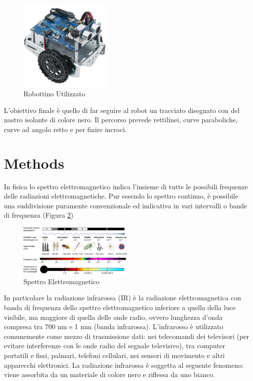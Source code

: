 \documentclass[twoside,twocolumn]{article}
\begin{document}
\begin{figure}[h]
	\centering
	\includegraphics[width=0.4\textwidth]{immagini/robot}
	\caption{Robottino Utilizzato}
	\label{fig:robot}
\end{figure}

L'obiettivo finale è quello di far seguire al robot un tracciato disegnato con del nastro isolante di colore nero. Il percorso prevede rettilinei, curve paraboliche, curve ad angolo retto e per finire incroci.

\section{Methods}

In fisica lo spettro elettromagnetico indica l'insieme di tutte le possibili frequenze delle radiazioni elettromagnetiche. Pur essendo lo spettro continuo, è possibile una suddivisione puramente convenzionale ed indicativa in vari intervalli o bande di frequenza (Figura \ref{fig:spettro})

\begin{figure}[h]
	\centering
	\includegraphics[width=0.5\textwidth]{immagini/spettro}
	\caption{Spettro Elettromagnetico}
	\label{fig:spettro}
\end{figure}

In particolare la radiazione infrarossa (IR) è la radiazione elettromagnetica con banda di frequenza dello spettro elettromagnetico inferiore a quella della luce visibile, ma maggiore di quella delle onde radio, ovvero lunghezza d'onda compresa tra 700 nm e 1 mm (banda infrarossa).
L'infrarosso è utilizzato comunemente come mezzo di trasmissione dati: nei telecomandi dei televisori (per evitare interferenze con le onde radio del segnale televisivo), tra computer portatili e fissi, palmari, telefoni cellulari, nei sensori di movimento e altri apparecchi elettronici. La radiazione infrarossa è soggetta al seguente fenomeno: viene assorbita da un materiale di colore nero e riflessa da uno bianco. 
\end{document}
